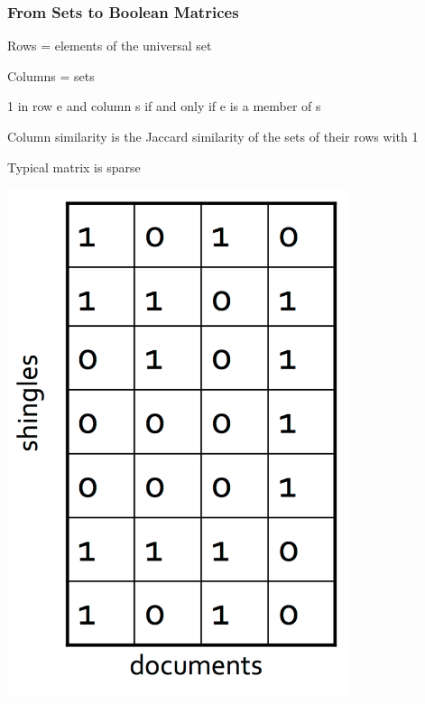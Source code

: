 \documentclass[svgnames]{beamer}
\begin{document}
\begin{frame} \frametitle{From Sets to Boolean Matrices}

Rows = elements of the universal set

Columns = sets

1 in row e and column s if and only if e is a member of s

Column similarity is the Jaccard similarity of the sets of their rows with 1

Typical matrix is sparse

\includegraphics[width=10cm]{matrix}

\end{frame}

  
\end{document}
